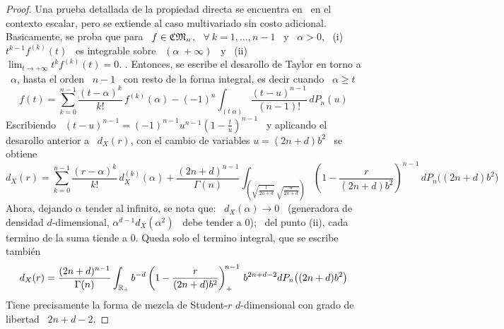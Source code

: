 \begin{proof}
  Una prueba detallada  de la propiedad directa se  encuentra en~\cite{Wil56} en
  el  contexto  escalar,  pero  se  extiende  al  caso  multivariado  sin  costo
  adicional.  Basicamente, se proba que para \  $f \in \mathfrak{CM}_n$, \ $\forall \: k =
  1,  \ldots ,  n-1$ \  y \  $\alpha >  0$, \  (i) \  $t^{k-1} f^{(k)}(t)$  \ es
  integrable sobre \  $(\alpha \; +\infty)$ \ y \  (ii) \ $\displaystyle \lim_{t
    \to +\infty} t^k f^{(k)}(t) = 0$. .   Entonces, se  escribe el  desarollo de Taylor  en torno  a \
  $\alpha$, hasta el  orden \ $n-1$ \  con resto de la forma  integral, es decir
  cuando \ $\alpha \ge t$
  \[
  f(t) =  \sum_{k=0}^{n-1} \frac{(t-\alpha)^k}{k!}  \,  f^{(k)}(\alpha) - (-1)^n
  \int_{(t \; \alpha)} \frac{(t-u)^{n-1}}{(n-1)!}  \, dP_n(u)
  \]
  Escribiendo  \  $(t-u)^{n-1}  =  (-1)^{n-1}  u^{n-1} \left(  1  -  \frac{t}{u}
  \right)^{n-1}$ \  y aplicando  el desarollo anterior  a \ $d_X(r)$,  con el
  cambio de variables $u = (2 n + d) b^2$ \ se obtiene
  \[
  d_X(r)  =  \sum_{k=0}^{n-1}  \frac{(r-\alpha)^k}{k!}  \,  d_X^{(k)}(\alpha)  +
  \frac{(2  n + d)^{n-1}}{\Gamma(n)}  \int_{\left( \sqrt{\frac{t}{2  n +  d}} \;
      \sqrt{\frac{\alpha}{2 n + d}} \right)} \left(  1 - \frac{r}{(2 n + d) b^2}
  \right)^{n-1} \, dP_n\big( (2 n + d) b^2 \big)
  \]
  Ahora, dejando $\alpha$ tender al infinito, se nota que: \ $d_X(\alpha) \to 0$
  \ (generadora de densidad $d$-dimensional, $\alpha^{d-1} d_X(\alpha^2)$ \ debe
  tender a 0); \ del punto (ii), cada  termino de la suma tiende a 0. Queda solo
  el termino integral, que se escribe tambi\'en
  \[
  d_X(r) =  \frac{(2 n +  d)^{n-1}}{\Gamma(n)} \int_{\mathbb{R}_+} b^{-d} \left(  1 -
    \frac{r}{(2 n + d) b^2} \right)_+^{\!n-1} \, b^{2 n +d - 2} dP_n\big( (2 n +
  d) b^2 \big)
  \]
  Tiene precisamente la forma de mezcla de Student-$r$ $d$-dimensional con grado
  de libertad \ $2 n + d - 2$.
\end{proof}

